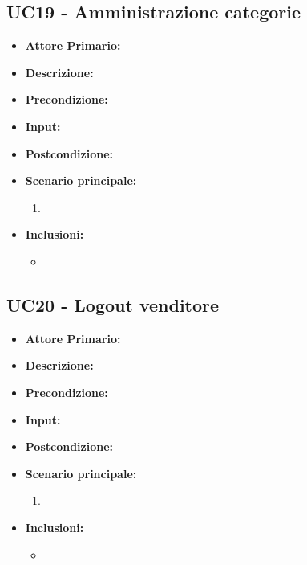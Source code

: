 \subsection{UC19 - Amministrazione categorie}
\begin{itemize}
    \item \textbf{Attore Primario:} 
    \item \textbf{Descrizione:}
    \item \textbf{Precondizione:}
    \item \textbf{Input:}
    \item \textbf{Postcondizione:}
    \item \textbf{Scenario principale:}
    \begin{enumerate}
        \item 
    \end{enumerate}
    \item \textbf{Inclusioni:}
    \begin{itemize}
        \item
    \end{itemize}
\end{itemize}
\subsection{UC20 - Logout venditore}
\begin{itemize}
    \item \textbf{Attore Primario:} 
    \item \textbf{Descrizione:}
    \item \textbf{Precondizione:}
    \item \textbf{Input:}
    \item \textbf{Postcondizione:}
    \item \textbf{Scenario principale:}
    \begin{enumerate}
        \item 
    \end{enumerate}
    \item \textbf{Inclusioni:}
    \begin{itemize}
        \item
    \end{itemize}
\end{itemize}
